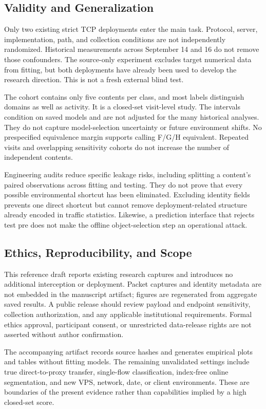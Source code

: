 \subsection{Validity and Generalization}
Only two existing strict TCP deployments enter the main task. Protocol, server, implementation, path, and collection conditions are not independently randomized. Historical measurements across September 14 and 16 do not remove those confounders. The source-only experiment excludes target numerical data from fitting, but both deployments have already been used to develop the research direction. This is not a fresh external blind test.

The cohort contains only five contents per class, and most labels distinguish domains as well as activity. It is a closed-set visit-level study. The intervals condition on saved models and are not adjusted for the many historical analyses. They do not capture model-selection uncertainty or future environment shifts. No prespecified equivalence margin supports calling F/G/H equivalent. Repeated visits and overlapping sensitivity cohorts do not increase the number of independent contents.

Engineering audits reduce specific leakage risks, including splitting a content's paired observations across fitting and testing. They do not prove that every possible environmental shortcut has been eliminated. Excluding identity fields prevents one direct shortcut but cannot remove deployment-related structure already encoded in traffic statistics. Likewise, a prediction interface that rejects test pre does not make the offline object-selection step an operational attack.

\subsection{Ethics, Reproducibility, and Scope}
This reference draft reports existing research captures and introduces no additional interception or deployment. Packet captures and identity metadata are not embedded in the manuscript artifact; figures are regenerated from aggregate saved results. A public release should review payload and endpoint sensitivity, collection authorization, and any applicable institutional requirements. Formal ethics approval, participant consent, or unrestricted data-release rights are not asserted without author confirmation.

The accompanying artifact records source hashes and generates empirical plots and tables without fitting models. The remaining unvalidated settings include true direct-to-proxy transfer, single-flow classification, index-free online segmentation, and new VPS, network, date, or client environments. These are boundaries of the present evidence rather than capabilities implied by a high closed-set score.
